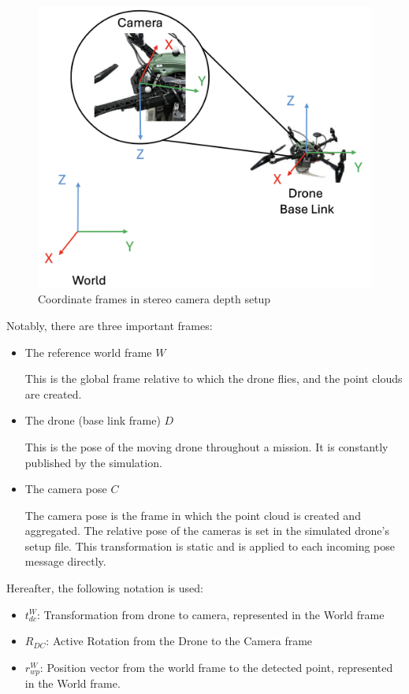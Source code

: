 \begin{figure}[h]
\centering
\includegraphics[scale=0.2]{images/stereo_camera_depth/frames.png}
\caption{Coordinate frames in stereo camera depth setup}
\label{fig:frames}
\end{figure}

Notably, there are three important frames:

\begin{itemize}
    \item The reference world frame $W$

    This is the global frame relative to which the drone flies, and the point clouds are created.

    \item The drone (base link frame) $D$
    
    This is the pose of the moving drone throughout a mission. It is constantly published by the simulation.

    \item The camera pose $C$
    
    The camera pose is the frame in which the point cloud is created and aggregated. The relative pose of the cameras is set in the simulated drone's setup file. This transformation is static and is applied to each incoming pose message directly.
\end{itemize}

Hereafter, the following notation is used:

\begin{itemize}
    \item $t_{dc}^W$: Transformation from drone to camera, represented in the World frame
    \item $R_{DC}$: Active Rotation from the Drone to the Camera frame
    \item $r_{wp}^W$: Position vector from the world frame to the detected point, represented in the World frame.
\end{itemize}

